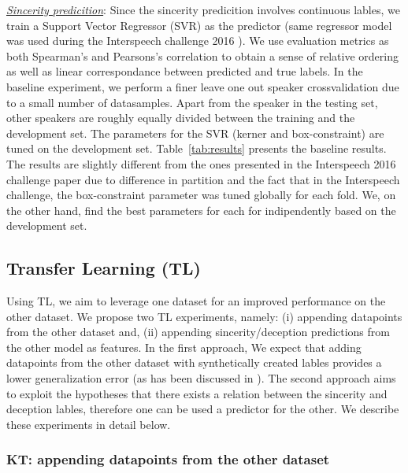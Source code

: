 \documentclass{article}
\begin{document}
\noindent\underline{\it Sincerity predicition}:
Since the sincerity predicition involves continuous lables, we train a Support Vector Regressor (SVR) as the predictor (same regressor model was used during the Interspeech challenge 2016 \cite{schuller2016interspeech}).
We use evaluation metrics as both Spearman's and Pearsons's correlation to obtain a sense of relative ordering as well as linear correspondance between predicted and true labels. 
In the baseline experiment, we perform a finer leave one out speaker crossvalidation due to a small number of datasamples.
Apart from the speaker in the testing set, other speakers are roughly equally divided between the training and the development set.
The parameters for the SVR (kerner and box-constraint) are tuned on the development set. 
Table~\ref{tab:results} presents the baseline results.
The results are slightly different from the ones presented in the Interspeech 2016 challenge paper \cite{schuller2016interspeech} due to difference in partition and the fact that in the Interspeech challenge, the box-constraint parameter was tuned globally for each fold.
We, on the other hand, find the best parameters for each for indipendently based on the development set. 

\subsection{Transfer Learning (TL)}
Using TL, we aim to leverage one dataset for an improved performance on the other dataset.
We propose two TL experiments, namely: (i) appending datapoints from the other dataset and, (ii) appending sincerity/deception predictions from the other model as features.
In the first approach, We expect that adding datapoints from the other dataset with synthetically created lables provides a lower generalization error (as has been discussed in \cite{}). 
The second approach aims to exploit the hypotheses that there exists a relation between the sincerity and deception lables, therefore one can be used a predictor for the other.
We describe these experiments in detail below. 

\subsubsection{KT: appending datapoints from the other dataset}
\end{document}
